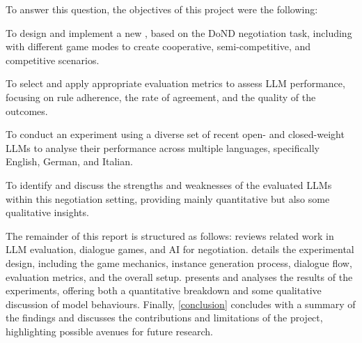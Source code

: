 To answer this question, the objectives of this project were the following:
\begin{enumerate*}
  \item To design and implement a new , based on the DoND negotiation task, including with different game modes to create cooperative, semi-competitive, and competitive scenarios.
  \item To select and apply appropriate evaluation metrics to assess LLM performance, focusing on rule adherence, the rate of agreement, and the quality of the outcomes.
  \item To conduct an experiment using a diverse set of recent open- and closed-weight LLMs to analyse their performance across multiple languages, specifically English, German, and Italian.
  \item To identify and discuss the strengths and weaknesses of the evaluated LLMs within this negotiation setting, providing mainly quantitative but also some qualitative insights.
\end{enumerate*}

The remainder of this report is structured as follows:
 reviews related work in LLM evaluation, dialogue games, and AI for negotiation.
 details the experimental design, including the game mechanics, instance generation process, dialogue flow, evaluation metrics, and the overall setup.
 presents and analyses the results of the experiments, offering both a quantitative breakdown and some qualitative discussion of model behaviours.
Finally, \cref{conclusion} concludes with a summary of the findings and discusses the contributions and limitations of the project, highlighting possible avenues for future research.
